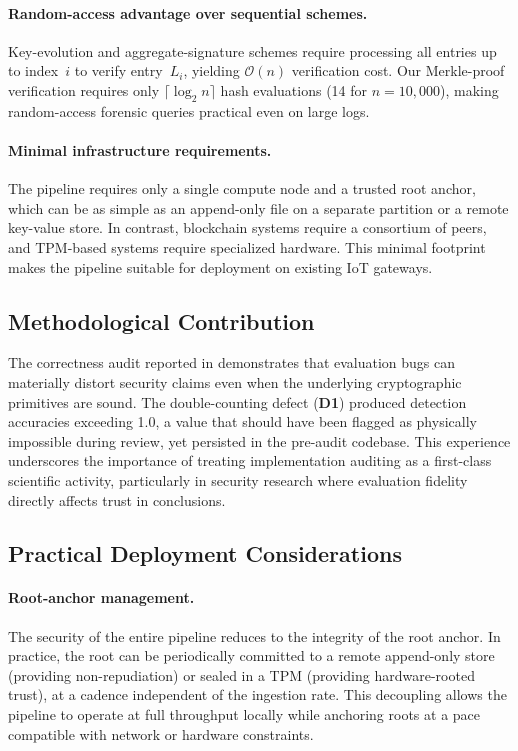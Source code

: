\documentclass[preprint,12pt]{elsarticle}
\begin{document}
\paragraph{Random-access advantage over sequential schemes.}
Key-evolution and aggregate-signature schemes require processing all entries up to index~$i$ to verify entry~$L_i$, yielding $\mathcal{O}(n)$ verification cost.
Our Merkle-proof verification requires only $\lceil \log_2 n \rceil$ hash evaluations (14 for $n = 10{,}000$), making random-access forensic queries practical even on large logs.

\paragraph{Minimal infrastructure requirements.}
The pipeline requires only a single compute node and a trusted root anchor, which can be as simple as an append-only file on a separate partition or a remote key-value store.
In contrast, blockchain systems require a consortium of peers, and TPM-based systems require specialized hardware.
This minimal footprint makes the pipeline suitable for deployment on existing IoT gateways.

\subsection{Methodological Contribution}

The correctness audit reported in  demonstrates that evaluation bugs can materially distort security claims even when the underlying cryptographic primitives are sound.
The double-counting defect (\textbf{D1}) produced detection accuracies exceeding 1.0, a value that should have been flagged as physically impossible during review, yet persisted in the pre-audit codebase.
This experience underscores the importance of treating implementation auditing as a first-class scientific activity, particularly in security research where evaluation fidelity directly affects trust in conclusions.

\subsection{Practical Deployment Considerations}

\paragraph{Root-anchor management.}
The security of the entire pipeline reduces to the integrity of the root anchor.
In practice, the root can be periodically committed to a remote append-only store (providing non-repudiation) or sealed in a TPM (providing hardware-rooted trust), at a cadence independent of the ingestion rate.
This decoupling allows the pipeline to operate at full throughput locally while anchoring roots at a pace compatible with network or hardware constraints.
\end{document}
